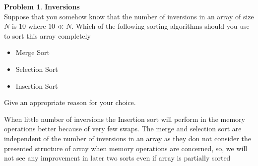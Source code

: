 \documentclass{article}
\theoremstyle{definition}
\newtheorem{Q}{Problem}
\begin{document}
\begin{Q}
\textbf{Inversions}\\
Suppose that you somehow know that the number of inversions in an array of size $N$ is $10$ where $10\ll N$. Which of the following sorting algorithms should you use to sort this array completely
\begin{itemize}
 \item Merge Sort
 \item Selection Sort
 \item Insertion Sort
\end{itemize}  

Give an appropriate reason for your choice.

\end{Q}
When little number of inversions the Insertion sort will perform in the memory operations better because of very few swaps.
The merge and selection sort are independent of the number of inversions in an array as they don not consider the presented structure of array when memory operations are concerned, so, we will not see any improvement in later two sorts even if array is partially sorted
\end{document}
